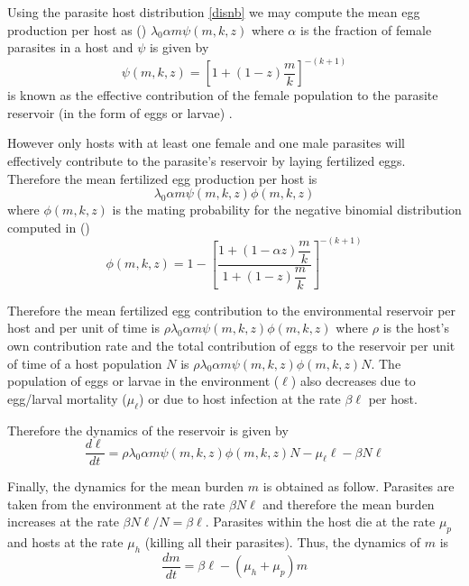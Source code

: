 \documentclass[12pt,a4paper]{article}
\theoremstyle{plain}%
\theoremstyle{definition}
\theoremstyle{remark}
\begin{document}
Using the parasite host distribution \ref{disnb} we may compute the mean egg production per host as (\cite{lopez2022general})
$\lambda_0
\alpha m
\psi(m,k,z)$
where $\alpha$  is the fraction of female parasites in a host and $\psi$ is given by
\begin{equation}
\psi(m,k,z)=\left[ 1+(1-z)\dfrac{m}{k}\right]^{-(k+1)}
\end{equation}
 is  known as the effective contribution of the female population to the parasite reservoir (in the form of eggs or larvae) \cite{churcher2006density}.

However only hosts with at least one female and one male parasites will effectively contribute to the parasite's reservoir by laying fertilized eggs. Therefore the mean fertilized egg production per host is 
\begin{equation}\label{meanfertilizedeggs}
\lambda_0
\alpha m
\psi(m,k,z)\phi(m,k,z)
\end{equation} 
where $\phi(m,k,z)$ is the mating probability for the negative binomial distribution computed in (\cite{lopez2022general})
 \begin{equation}
 \phi(m,k,z)=1-\left[ \frac{1+ \left( 1-
 	\alpha z
 	\right) \dfrac{m}{k}}{1+(1-z)\dfrac{m}{k}}\right] ^{-(k+1)}
 \end{equation}

Therefore the mean fertilized egg contribution to the environmental reservoir  per host and per unit of time is
$\rho\lambda_0
\alpha m
\psi(m,k,z) \phi(m,k,z)$ where $\rho$ 
is the host's own contribution rate and the total contribution of eggs to the reservoir per unit of time of a host population $N$ is 
$\rho\lambda_0
\alpha m
\psi(m,k,z) \phi(m,k,z) N$. 
The population of eggs or larvae in the environment ($\ell$) also decreases due to egg/larval mortality ($\mu_{\ell}$) or due to host infection at the rate $\beta \ell$ per host. 

Therefore the dynamics of the reservoir is given by
	\begin{equation}\label{eqreservorio}
	\dfrac{d\ell}{dt}= \rho\lambda_0
	\alpha m
	\psi(m,k,z) \phi(m,k,z) N- \mu_{\ell} \ell -\beta N \ell 
	\end{equation}

Finally, the dynamics for the mean burden $m$ is obtained as follow. Parasites are taken from the environment at the rate 	$\beta N \ell $ and therefore the mean burden increases at the rate  $\beta  N\ell/N=\beta\ell $. Parasites within the host die at the rate $\mu_p$ and hosts at the rate $\mu_h$ (killing all their parasites). Thus, the dynamics of $m$ is
\begin{equation}\label{eqm}
	\dfrac{dm}{dt}=\beta \ell - (\mu_h+\mu_p)m
	\end{equation}
	
\end{document}

